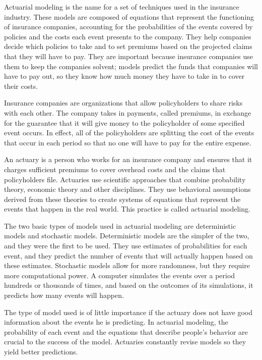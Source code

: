 Actuarial modeling is the name for a set of techniques used in the insurance industry. These models are composed of equations that represent the functioning of insurance companies, accounting for the probabilities of the events covered by policies and the costs each event presents to the company. They help companies decide which policies to take and to set premiums based on the projected claims that they will have to pay. They are important because insurance companies use them to keep the companies solvent; models predict the funds that companies will have to pay out, so they know how much money they have to take in to cover their costs.

Insurance companies are organizations that allow policyholders to share risks with each other. The company takes in payments, called premiums, in exchange for the guarantee that it will give money to the policyholder of some specified event occurs. In effect, all of the policyholders are splitting the cost of the events that occur in each period so that no one will have to pay for the entire expense.

An actuary is a person who works for an insurance company and ensures that it charges sufficient premiums to cover overhead costs and the claims that policyholders file. Actuaries use scientific approaches that combine probability theory, economic theory and other disciplines. They use behavioral assumptions derived from these theories to create systems of equations that represent the events that happen in the real world. This practice is called actuarial modeling.

The two basic types of models used in actuarial modeling are deterministic models and stochastic models. Deterministic models are the simpler of the two, and they were the first to be used. They use estimates of probabilities for each event, and they predict the number of events that will actually happen based on these estimates. Stochastic models allow for more randomness, but they require more computational power. A computer simulates the events over a period hundreds or thousands of times, and based on the outcomes of its simulations, it predicts how many events will happen.

The type of model used is of little importance if the actuary does not have good information about the events he is predicting. In actuarial modeling, the probability of each event and the equations that describe people’s behavior are crucial to the success of the model. Actuaries constantly revise models so they yield better predictions.
